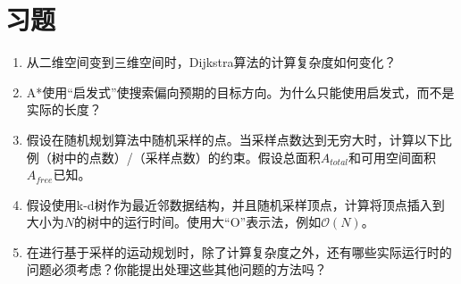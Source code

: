 \section*{习题}\small
\begin{enumerate}



\item 从二维空间变到三维空间时，Dijkstra算法的计算复杂度如何变化？
\item A*使用“启发式”使搜索偏向预期的目标方向。为什么只能使用启发式，而不是实际的长度？
\item 假设在随机规划算法中随机采样的点。当采样点数达到无穷大时，计算以下比例（树中的点数）/（采样点数）的约束。假设总面积$A_{total}$和可用空间面积$A_{free}$已知。

\item 假设使用k-d树作为最近邻数据结构，并且随机采样顶点，计算将顶点插入到大小为$N$的树中的运行时间。使用大“O”表示法，例如$\mathcal{O}(N)$。

\item 在进行基于采样的运动规划时，除了计算复杂度之外，还有哪些实际运行时的问题必须考虑？你能提出处理这些其他问题的方法吗？
\end{enumerate}
\normalsize
